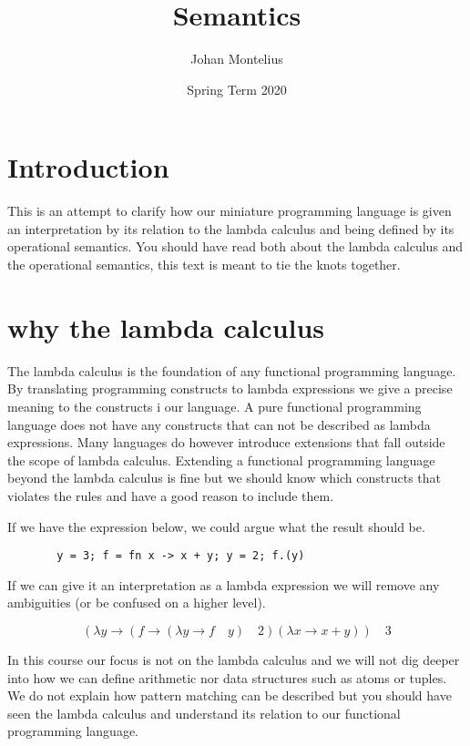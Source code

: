 \documentclass[a4paper,11pt]{article}
\begin{document}
\title{
    \textbf{ Semantics }\\
}
\author{Johan Montelius}
\date{Spring Term 2020}
\maketitle
{}

\section*{Introduction}

This is an attempt to clarify how our miniature programming language is
given an interpretation by its relation to the lambda calculus and
being defined by its operational semantics. You should have read both
about the lambda calculus and the operational semantics, this text is
meant to tie the knots together.


\section{why the lambda calculus}

The lambda calculus is the foundation of any functional programming
language. By translating programming constructs to lambda expressions
we give a precise meaning to the constructs i our language. A pure
functional programming language does not have any constructs that can
not be described as lambda expressions.  Many languages do however
introduce extensions that fall outside the scope of lambda
calculus. Extending a functional programming language beyond the
lambda calculus is fine but we should know which constructs that
violates the rules and have a good reason to include them.

If we have the expression below, we could argue what the result should
be.

\begin{figure}[h]
\centering
\verb|  y = 3; f = fn x -> x + y; y = 2; f.(y) |
\end{figure}

If we can give it an interpretation as a lambda expression we will
remove any ambiguities (or be confused on a higher level).

$$(\lambda y \rightarrow (f \rightarrow  (\lambda y \rightarrow f \quad y) \quad 2) (\lambda x \rightarrow x + y)) \quad 3 $$

In this course our focus is not on the lambda calculus and we will not
dig deeper into how we can define arithmetic nor data structures such
as atoms or tuples. We do not explain how pattern matching can be
described but you should have seen the lambda calculus and understand
its relation to our functional programming language.
\end{document}
